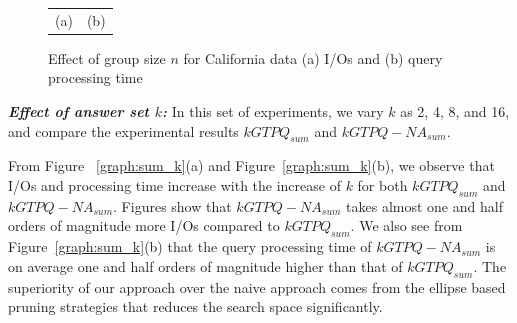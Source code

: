 \begin{figure}[htbp]
\begin{center}
\begin{tabular}{cc}
      \scriptsize{(a) \textsc{}\hspace{0mm}} & \scriptsize{(b) \textsc{}}\\
        \end{tabular}
    \caption{Effect of group size $n$ for California data (a) I/Os and (b) query processing time}
    \label{graph:sum_g}
  \end{center}
   \vspace{-6mm}
\end{figure}

\vspace*{10pt}
\textbf{\emph{Effect of answer set $k$: }} In this set of experiments, we vary $k$ as 2, 4, 8, and 16, and compare the experimental results $kGTPQ_{sum}$ and $kGTPQ-NA_{sum}$.


From Figure ~\ref{graph:sum_k}(a) and Figure~\ref{graph:sum_k}(b), we observe that I/Os and processing time increase with the increase of $k$ for both $kGTPQ_{sum}$ and $kGTPQ-NA_{sum}$. Figures show that $kGTPQ-NA_{sum}$ takes almost one and half orders of magnitude more I/Os compared to $kGTPQ_{sum}$. We also see from Figure~\ref{graph:sum_k}(b) that the query processing time of $kGTPQ-NA_{sum}$ is on average one and
half orders of magnitude higher than that of $kGTPQ_{sum}$. The superiority of our approach over the naive approach comes from the ellipse based pruning strategies that reduces the search space significantly.

